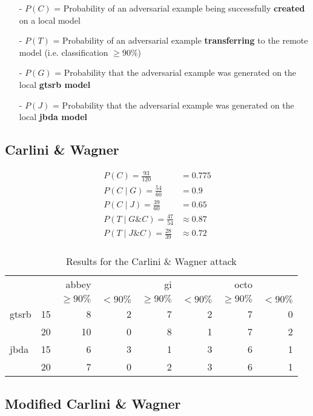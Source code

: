 \begin{itemize}
\item[-] $P(C)$ = Probability of an adversarial example being successfully \textbf{created} on a local model
\item[-] $P(T)$ = Probability of an adversarial example \textbf{transferring} to the remote model (i.e. classification $\geq90\%$)
\item[-] $P(G)$ = Probability that the adversarial example was generated on the local \textbf{gtsrb model}
\item[-] $P(J)$ = Probability that the adversarial example was generated on the local \textbf{jbda model}
\end{itemize}

\subsection{Carlini \& Wagner}

\begin{align}
P(C) = \frac{93}{120} &= 0.775\\[1ex]
P(C \mid G) = \frac{54}{60} &= 0.9\\[1ex]
P(C \mid J) = \frac{39}{60} &= 0.65\\[1ex]
P(T \mid G \& C) = \frac{47}{54} &\approx 0.87\\[1ex]
P(T \mid J \& C) = \frac{28}{39} &\approx 0.72\\[1ex]
\end{align}

\begin{table}
\begin{tabular}{l l | r r | r r | r r}
& & abbey & & gi & & octo & \\[1ex]
& & \footnotesize$\geq90\%$ & \footnotesize$<90\%$ & \footnotesize$\geq90\%$ & \footnotesize$<90\%$ & \footnotesize$\geq90\%$ & \footnotesize$<90\%$ \\[1ex]
\hline
gtsrb & 15 & 8 & 2 & 7 & 2 & 7 & 0 \\[1ex]
& 20 & 10 & 0 & 8 & 1 & 7 & 2 \\[1ex]
\hline
jbda & 15 & 6 & 3 & 1 & 3 & 6 & 1 \\[1ex]
& 20 & 7 & 0 & 2 & 3 & 6 & 1
\end{tabular}
\caption{Results for the Carlini \& Wagner attack}
\label{tab:cwl2_result}
\end{table}

\subsection{Modified Carlini \& Wagner}

